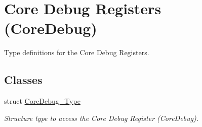 \hypertarget{group___c_m_s_i_s___core_debug}{}\section{Core Debug Registers (Core\+Debug)}
\label{group___c_m_s_i_s___core_debug}


Type definitions for the Core Debug Registers.  


\subsection*{Classes}
\begin{DoxyCompactItemize}
\item 
struct \mbox{\hyperlink{struct_core_debug___type}{Core\+Debug\+\_\+\+Type}}
\begin{DoxyCompactList}\small\item\em Structure type to access the Core Debug Register (Core\+Debug). \end{DoxyCompactList}\end{DoxyCompactItemize}
